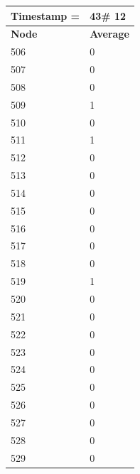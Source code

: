 \begin{tabular}{|l||l|}
\hline
\textbf{Timestamp =} & \textbf{43}\# 12\\\hline
	\textbf{Node} & \textbf{Average} \\ \hline
\hline
	506 & 0 \\ \hline
	507 & 0 \\ \hline
	508 & 0 \\ \hline
	509 & 1 \\ \hline
	510 & 0 \\ \hline
	511 & 1 \\ \hline
	512 & 0 \\ \hline
	513 & 0 \\ \hline
	514 & 0 \\ \hline
	515 & 0 \\ \hline
	516 & 0 \\ \hline
	517 & 0 \\ \hline
	518 & 0 \\ \hline
	519 & 1 \\ \hline
	520 & 0 \\ \hline
	521 & 0 \\ \hline
	522 & 0 \\ \hline
	523 & 0 \\ \hline
	524 & 0 \\ \hline
	525 & 0 \\ \hline
	526 & 0 \\ \hline
	527 & 0 \\ \hline
	528 & 0 \\ \hline
	529 & 0 \\ \hline
\end{tabular}

